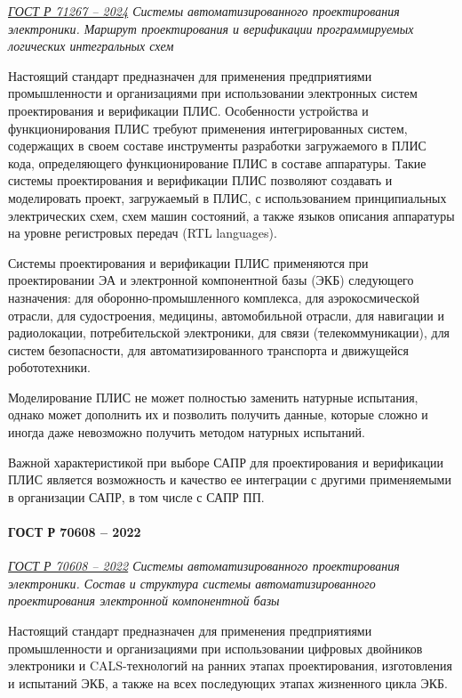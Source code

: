\emph{\href{https://docs.cntd.ru/document/1305118385}{ГОСТ Р 71267 -- 2024}
Системы автоматизированного проектирования электроники.
Маршрут проектирования
и верификации программируемых логических интегральных схем
}

Настоящий стандарт предназначен для применения предприятиями промышленности
и организациями при использовании электронных систем проектирования
и верификации ПЛИС.
Особенности устройства и функционирования
ПЛИС требуют применения интегрированных систем,
содержащих в своем составе инструменты разработки загружаемого в ПЛИС кода,
определяющего функционирование ПЛИС в составе аппаратуры.
Такие системы проектирования и верификации ПЛИС позволяют создавать
и моделировать проект, загружаемый в ПЛИС,
с использованием принципиальных электрических схем, схем машин состояний,
а также языков описания аппаратуры на уровне регистровых передач (RTL languages).

Системы проектирования и верификации ПЛИС применяются при проектировании ЭА
и электронной компонентной базы (ЭКБ) следующего назначения:
для оборонно-промышленного комплекса, для аэрокосмической отрасли,
для судостроения, медицины, автомобильной отрасли,
для навигации и радиолокации, потребительской электроники,
для связи (телекоммуникации), для систем безопасности,
для автоматизированного транспорта и движущейся робототехники.

Моделирование ПЛИС не может полностью заменить натурные испытания,
однако может дополнить их и позволить получить данные,
которые сложно и иногда даже невозможно получить методом натурных испытаний.

Важной характеристикой при выборе САПР для проектирования
и верификации ПЛИС является возможность
и качество ее интеграции с другими применяемыми в организации САПР,
в том числе с САПР ПП.

\paragraph{ГОСТ Р 70608 -- 2022}

\emph{\href{https://docs.cntd.ru/document/1200195173}{ГОСТ Р 70608 -- 2022}
Системы автоматизированного проектирования электроники.
Состав и структура системы автоматизированного проектирования электронной компонентной базы
}

Настоящий стандарт предназначен для применения предприятиями промышленности
и организациями при использовании цифровых двойников электроники
и CALS-технологий на ранних этапах проектирования,
изготовления и испытаний ЭКБ,
а также на всех последующих этапах жизненного цикла ЭКБ.

